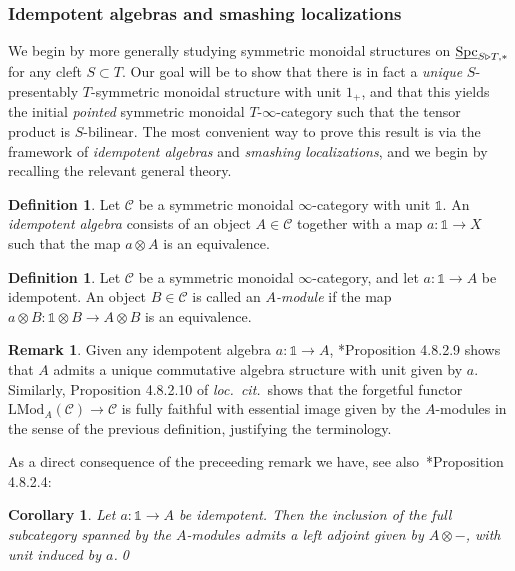 \documentclass[reqno]{memo-l}
\theoremstyle{mythm}
\newtheorem{cor}[thm]{Corollary}
\theoremstyle{definition}
\newtheorem{rk}[thm]{Remark}
\newtheorem{definition}[thm]{Definition}
\numberwithin{equation}{section}
\newcommand{\Cc}{{\mathcal{C}}}
\newcommand{\bbone}{{\mathds{1}}}
\DeclareMathOperator{\Spc}{Spc}
\newcommand{\ulhelper}[2]{\underline{\setbox0=\hbox{$#1#2$}\dp0=0.4pt \box0\relax}}
\newcommand{\ul}[1]{{\mathpalette\ulhelper{#1}}\hbox{\rule[-2pt]{0pt}{0pt}}}
\begin{document}
\medskip
\subsubsection{Idempotent algebras and smashing localizations} We begin by more generally studying symmetric monoidal structures on $\ul\Spc_{S\triangleright T,*}$ for any cleft $S\subset T$. Our goal will be to show that there is in fact a \emph{unique} $S$-presentably $T$-symmetric monoidal structure with unit $1_+$, and that this yields the initial \emph{pointed} symmetric monoidal $T$-$\infty$-category such that the tensor product is $S$-bilinear. The most convenient way to prove this result is via the framework of \emph{idempotent algebras} and \emph{smashing localizations}, and we begin by recalling the relevant general theory.

\begin{definition}
    Let $\Cc$ be a symmetric monoidal $\infty$-category with unit $\bbone$. An \emph{idempotent algebra} consists of an object $A\in\Cc$ together with a map $a\colon\bbone\to X$ such that the map $a\otimes A$ is an equivalence. 
\end{definition}

\begin{definition}
    Let $\Cc$ be a symmetric monoidal $\infty$-category, and let $a\colon\bbone\to A$ be idempotent. An object $B\in\Cc$ is called an \emph{$A$-module} if the map $a\otimes B\colon \bbone\otimes B\to A\otimes B$ is an equivalence.
\end{definition}

\begin{rk}\label{rk:idempotent-algs-are-algs}
    Given any idempotent algebra $a\colon \bbone\to A$, \cite{HA}*{Proposition 4.8.2.9} shows that $A$ admits a unique commutative algebra structure with unit given by $a$. Similarly, {Proposition 4.8.2.10} of \emph{loc.\ cit.}\ shows that the forgetful functor $\text{LMod}_A(\Cc)\to\Cc$ is fully faithful with essential image given by the $A$-modules in the sense of the previous definition, justifying the terminology.
\end{rk}

As a direct consequence of the preceeding remark we have, see also~\cite{HA}*{Proposition 4.8.2.4}:

\begin{cor}\label{cor:idempotent-la}
    Let $a\colon\bbone\to A$ be idempotent. Then the inclusion of the full subcategory spanned by the $A$-modules admits a left adjoint given by $A\otimes-$, with unit induced by $a$.\qed
\end{cor}
\end{document}
